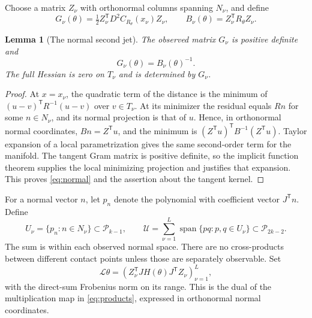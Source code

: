 \documentclass[11pt,reqno]{amsart}
\numberwithin{equation}{section}
\newtheorem{lemma}[theorem]{Lemma}
\theoremstyle{definition}\newtheorem{definition}[theorem]{Definition}
\theoremstyle{remark}\newtheorem{remark}[theorem]{Remark}
\newcommand{\Span}{\operatorname{span}}
\newcommand{\cP}{\mathcal P}
\newcommand{\cL}{\mathcal L}
\newcommand{\cU}{\mathcal U}
\begin{document}
Choose a matrix $Z_\nu$ with orthonormal columns spanning $N_\nu$, and define
\[
 G_\nu(\theta)=\tfrac12Z_\nu^{\mathsf T}D^2 C_{R_\theta}(x_\nu)Z_\nu,
 \qquad B_\nu(\theta)=Z_\nu^{\mathsf T}R_\theta Z_\nu.
\]
\begin{lemma}[The normal second jet]\label{lem:normal}
The observed matrix $G_\nu$ is positive definite and
\begin{equation}\label{eq:normal}
 G_\nu(\theta)=B_\nu(\theta)^{-1}.
\end{equation}
The full Hessian is zero on $T_\nu$ and is determined by $G_\nu$.
\end{lemma}
\begin{proof}
At $x=x_\nu$, the quadratic term of the distance is the minimum of $(u-v)^{\mathsf T}R^{-1}(u-v)$ over $v\in T_\nu$. At its minimizer the residual equals $Rn$ for some $n\in N_\nu$, and its normal projection is that of $u$. Hence, in orthonormal normal coordinates, $Bn=Z^{\mathsf T}u$, and the minimum is $(Z^{\mathsf T}u)^{\mathsf T}B^{-1}(Z^{\mathsf T}u)$. Taylor expansion of a local parametrization gives the same second-order term for the manifold. The tangent Gram matrix is positive definite, so the implicit function theorem supplies the local minimizing projection and justifies that expansion. This proves \eqref{eq:normal} and the assertion about the tangent kernel.
\end{proof}

For a normal vector $n$, let $p_n$ denote the polynomial with coefficient vector $J^{\mathsf T}n$. Define
\begin{equation}\label{eq:products}
 U_\nu=\{p_n:n\in N_\nu\}\subset\cP_{k-1},\qquad
 \cU=\sum_{\nu=1}^L\Span\{p q:p,q\in U_\nu\}\subset\cP_{2k-2}.
\end{equation}
The sum is within each observed normal space. There are no cross-products between different contact points unless those are separately observable. Set
\[
 \cL\theta=(Z_\nu^{\mathsf T}JH(\theta)J^{\mathsf T}Z_\nu)_{\nu=1}^L,
\]
with the direct-sum Frobenius norm on its range. This is the dual of the multiplication map in \eqref{eq:products}, expressed in orthonormal normal coordinates.
\end{document}
